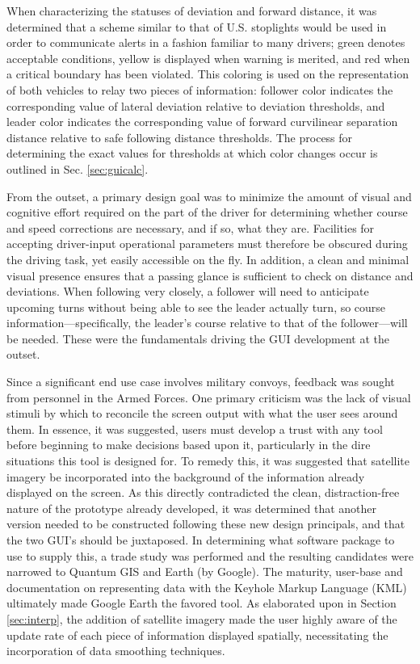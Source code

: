 \documentclass[12pt]{report}
\begin{document}
When characterizing the statuses of deviation and forward distance, it was determined that a scheme similar to that of U.S. stoplights would be used in order to communicate alerts in a fashion familiar to many drivers; green denotes acceptable conditions, yellow is displayed when warning is merited, and red when a critical boundary has been violated. This coloring is used on the representation of both vehicles to relay two pieces of information: follower color indicates the corresponding value of lateral deviation relative to deviation thresholds, and leader color indicates the corresponding value of forward curvilinear separation distance relative to safe following distance thresholds. The process for determining the exact values for thresholds at which color changes occur is outlined in Sec. \ref{sec:guicalc}.

From the outset, a primary design goal was to minimize the amount of visual and cognitive effort required on the part of the driver for determining whether course and speed corrections are necessary, and if so, what they are. Facilities for accepting driver-input operational parameters must therefore be obscured during the driving task, yet easily accessible on the fly. In addition, a clean and minimal visual presence ensures that a passing glance is sufficient to check on distance and deviations. When following very closely, a follower will need to anticipate upcoming turns without being able to see the leader actually turn, so course information---specifically, the leader's course relative to that of the follower---will be needed.  These were the fundamentals driving the GUI development at the outset.

Since a significant end use case involves military convoys, feedback was sought from personnel in the Armed Forces. One primary criticism was the lack of visual stimuli by which to reconcile the screen output with what the user sees around them. In essence, it was suggested, users must develop a trust with any tool before beginning to make decisions based upon it, particularly in the dire situations this tool is designed for. To remedy this, it was suggested that satellite imagery be incorporated into the background of the information already displayed on the screen. As this directly contradicted the clean, distraction-free nature of the prototype already developed, it was determined that another version needed to be constructed following these new design principals, and that the two GUI's should be juxtaposed. In determining what software package to use to supply this, a trade study was performed and the resulting candidates were narrowed to Quantum GIS and Earth (by Google). The maturity, user-base and documentation on representing data with the Keyhole Markup Language (KML) ultimately made Google Earth the favored tool. As elaborated upon in Section \ref{sec:interp}, the addition of satellite imagery made the user highly aware of the update rate of each piece of information displayed spatially, necessitating the incorporation of data smoothing techniques.
\end{document}
